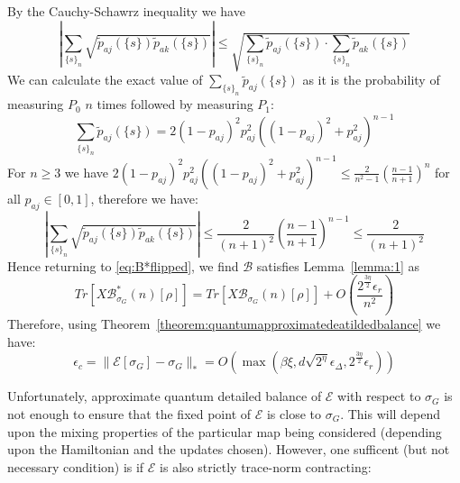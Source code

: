 \documentclass[aps,floatfix,10pt,amssymb,amsfont,amsmath,superscriptaddress,float,nofootinbib,longbibliography,nobalancelastpage,twocolumn]{revtex4-2}
\begin{document}
\begin{widetext}
\begin{equation}
\end{equation}
By the Cauchy-Schawrz inequality we have
\begin{equation}
   \left| \sum_{\{s\}_n}\sqrt{\tilde p_{aj}(\{s\})\tilde p_{ak}(\{s\})}\right| \leq \sqrt{\sum_{\{s\}_n} \tilde p_{aj}(\{s\})\cdot \sum_{\{s\}_n} \tilde p_{ak}(\{s\})}
\end{equation}
We can calculate the exact value of $\sum_{\{s\}_n} \tilde p_{aj}(\{s\})$ as it is the probability of measuring $P_0$ $n$ times followed by measuring $P_1$:
\begin{equation}
   \sum_{\{s\}_n} \tilde p_{aj}(\{s\}) = 2(1-p_{aj})^2p^2_{aj}((1-p_{aj})^2 + p_{aj}^2)^{n-1} 
\end{equation}
For $n\geq 3$ we have $2(1-p_{aj})^2p^2_{aj}((1-p_{aj})^2 + p_{aj}^2)^{n-1}  \leq \frac{2}{n^2-1}\left(\frac{n-1}{n+1}\right)^n$ for all $p_{aj} \in [0,1]$, therefore we have:
\begin{equation}
    \left| \sum_{\{s\}_n}\sqrt{\tilde p_{aj}(\{s\})\tilde p_{ak}(\{s\})}\right| \leq \frac{2}{(n+1)^2}\left(\frac{n-1}{n+1}\right)^{n-1} \leq \frac{2}{(n+1)^2}
\end{equation}
Hence returning to \eqref{eq:B*flipped}, we find $\mathcal{B}$ satisfies Lemma~\ref{lemma:1} as
\begin{equation}
    Tr[X\mathcal{B}^*_{\sigma_G}(n)[\rho]] = Tr[X\mathcal{B}_{\sigma_G}(n)[\rho]] + O\left(\frac{2^{\frac{3\eta}{2}}\epsilon_r}{n^2}\right)
\end{equation}
Therefore, using Theorem~\ref{theorem:quantumapproximatedeatildedbalance} we have:
 \begin{equation}
   \epsilon_c = \|\mathcal{E}[\sigma_G] - \sigma_G\|_* = O(\max(\beta \xi, d \sqrt{2^{\eta}}\epsilon_{\Delta}, 2^{\frac{3\eta}{2}}\epsilon_r))
    \label{eq:error_bound}
\end{equation}
\end{widetext}
 Unfortunately, approximate quantum detailed balance of $\mathcal{E}$ with respect to $\sigma_G$ is not enough to ensure that the fixed point of $\mathcal{E}$ is close to $\sigma_G$. This will depend upon the mixing properties of the particular map being considered (depending upon the Hamiltonian and the updates chosen). However, one sufficent (but not necessary condition) is if $\mathcal{E}$ is also strictly trace-norm contracting:
\end{document}
